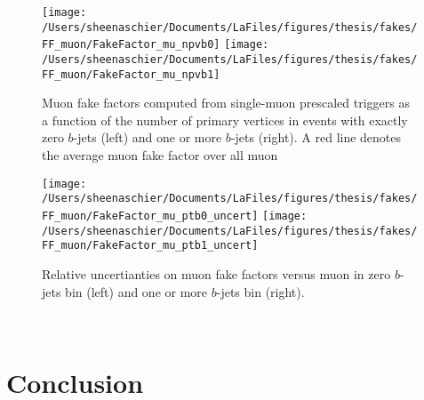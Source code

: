\begin{figure}[tbp]
  \centering
  \texttt{[image: /Users/sheenaschier/Documents/LaFiles/figures/thesis/fakes/FF\_muon/FakeFactor\_mu\_npvb0]}
  \texttt{[image: /Users/sheenaschier/Documents/LaFiles/figures/thesis/fakes/FF\_muon/FakeFactor\_mu\_npvb1]}\\
  \caption{Muon fake factors computed from single-muon prescaled triggers as a function of the number of primary vertices in events with exactly zero $b$-jets (left) and one or more $b$-jets (right).  A red line denotes the average muon fake factor over all muon \pt{}}
  \label{fig:muon_FF_npv}
\end{figure}

\begin{figure}[tbp]
  \centering
  \texttt{[image: /Users/sheenaschier/Documents/LaFiles/figures/thesis/fakes/FF\_muon/FakeFactor\_mu\_ptb0\_uncert]}
  \texttt{[image: /Users/sheenaschier/Documents/LaFiles/figures/thesis/fakes/FF\_muon/FakeFactor\_mu\_ptb1\_uncert]}\\
  \caption{Relative uncertianties on muon fake factors versus muon \pt{} in zero $b$-jets bin (left) and one or more $b$-jets bin (right).}
  \label{fig:muon_FF_rel_uncert}
\end{figure}

 \FloatBarrier
 
 \ \section{Conclusion}
